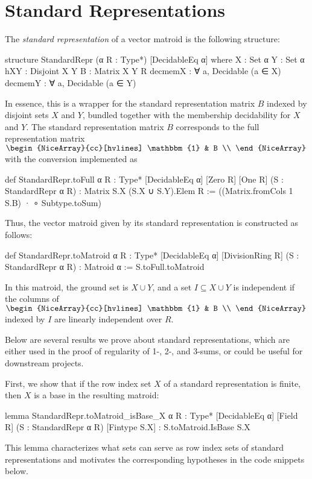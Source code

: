 \section{Standard Representations}

The \emph{standard representation} \cite{Oxley2011,Truemper2016} of a vector matroid is the following structure:
\begin{leancode}
structure StandardRepr (α R : Type*)
    [DecidableEq α] where
  X : Set α
  Y : Set α
  hXY : Disjoint X Y
  B : Matrix X Y R
  decmemX : ∀ a, Decidable (a ∈ X)
  decmemY : ∀ a, Decidable (a ∈ Y)
\end{leancode}
In essence, this is a wrapper for the standard representation matrix $B$ indexed by disjoint sets $X$ and $Y$, bundled together with the membership decidability for $X$ and $Y$. The standard representation matrix $B$ corresponds to the full representation matrix $\begin{NiceArray}{cc}[hvlines] \mathbbm{1} & B \\ \end{NiceArray}$ with the conversion implemented as
\begin{leancode}
def StandardRepr.toFull {α R : Type*}
    [DecidableEq α] [Zero R] [One R]
    (S : StandardRepr α R) :
    Matrix S.X (S.X ∪ S.Y).Elem R :=
  ((Matrix.fromCols 1 S.B) · ∘ Subtype.toSum)
\end{leancode}
Thus, the vector matroid given by its standard representation is constructed as follows:
\begin{leancode}
def StandardRepr.toMatroid {α R : Type*}
    [DecidableEq α] [DivisionRing R]
    (S : StandardRepr α R) :
    Matroid α :=
  S.toFull.toMatroid
\end{leancode}
In this matroid, the ground set is $X \cup Y$, and a set $I \subseteq X \cup Y$ is independent if the columns of
$\begin{NiceArray}{cc}[hvlines] \mathbbm{1} & B \\ \end{NiceArray}$
indexed by $I$ are linearly independent over $R$.

Below are several results we prove about standard representations, which are either used in the proof of regularity of 1-, 2-, and 3-sums, or could be useful for downstream projects.

First, we show that if the row index set $X$ of a standard representation is finite, then $X$ is a base in the resulting matroid:
\begin{leancode}
lemma StandardRepr.toMatroid_isBase_X
    {α R : Type*} [DecidableEq α] [Field R]
    (S : StandardRepr α R) [Fintype S.X] :
    S.toMatroid.IsBase S.X
\end{leancode}
This lemma characterizes what sets can serve as row index sets of standard representations and motivates the corresponding hypotheses in the code snippets below.

